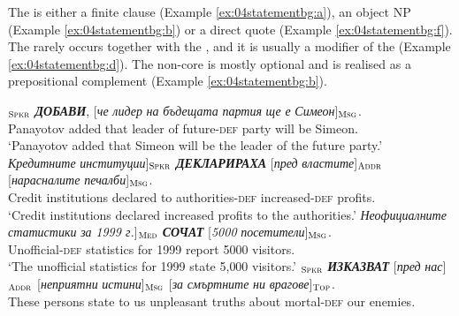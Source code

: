\documentclass[output=paper,colorlinks,citecolor=brown]{langscibook}
\begin{document}
The  is either a finite clause %
(Example \ref{ex:04statementbg:a}), an object NP (Example \ref{ex:04statementbg:b}) or a direct quote (Example \ref{ex:04statementbg:f}). The  rarely occurs together with the , and it is usually a modifier of the  (Example \ref{ex:04statementbg:d}). The non-core  is mostly optional and is realised as a prepositional complement (Example \ref{ex:04statementbg:b}).



\begin{exe}
\ex \label{ex:04statementbg}
\begin{xlist}
\ex  \label{ex:04statementbg:a}
$_{\text{\textsc{Spkr}}}$ \textit{\textbf{ДОБАВИ}}, [\textit{че} \textit{лидер} \textit{на} \textit{бъдещата} \textit{партия} \textit{ще} \textit{е} \textit{Симеон}]$_{\text{\textsc{Msg}}}$.
\\
Panayotov added that leader of future-\textsc{def} party will be Simeon.
\\
\glt `Panayotov added that Simeon will be the leader of the future party.'
\ex  \label{ex:04statementbg:b}
 \gll {[}\textit{Кредитните} \textit{институции}{]}$_{\text{\textsc{Spkr}}}$ \textit{\textbf{ДЕКЛАРИРАХА}} [\textit{пред} \textit{властите}]$_{\text{\textsc{Addr}}}$ [\textit{нарасналите} \textit{печалби}]$_{\text{\textsc{Msg}}}$. 
\\
Credit institutions declared to authorities-\textsc{def} increased-\textsc{def} profits.
\\
\glt `Credit institutions declared increased profits to the authorities.'
\ex  \label{ex:04statementbg:c}
\gll {[}\textit{Неофициалните} \textit{статистики} \textit{за} {\textit{1999 г.}}{]}$_{\text{\textsc{Med}}}$ \textit{\textbf{СОЧАТ}} [\textit{5000} \textit{посетители}]$_{\text{\textsc{Msg}}}$.
\\
Unofficial-\textsc{def} statistics for 1999 report 5000 visitors.
\\
\glt `The unofficial statistics for 1999 state 5,000 visitors.'
\ex  \label{ex:04statementbg:d}
$_{\text{\textsc{Spkr}}}$ \textit{\textbf{ИЗКАЗВАТ}} [\textit{пред} \textit{нас}]$_{\text{\textsc{Addr}}}$ [\textit{неприятни} \textit{истини}]$_{\text{\textsc{Msg}}}$ [\textit{за} \textit{смъртните} \textit{ни} \textit{врагове}]$_{\text{\textsc{Top}}}$.
\\
{These persons} state to us unpleasant truths about mortal-\textsc{def} our enemies.

\end{xlist}
\end{exe}
\end{document}
